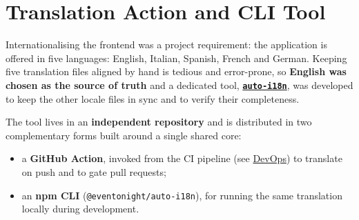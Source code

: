 \section{Translation Action and CLI Tool}

Internationalising the frontend was a project requirement: the application is offered in five languages: English, Italian, Spanish, French and German. Keeping five translation files aligned by hand is tedious and error-prone, so \textbf{English was chosen as the source of truth} and a dedicated tool, \href{https://github.com/EvenToNight/auto-i18n}{\textbf{\texttt{auto-i18n}}}, was developed to keep the other locale files in sync and to verify their completeness.

The tool lives in an \textbf{independent repository} and is distributed in two complementary forms built around a single shared core:

\begin{itemize}
  \item a \textbf{GitHub Action}, invoked from the CI pipeline (see \hyperref[sec:devops]{DevOps}) to translate on push and to gate pull requests;
  \item an \textbf{npm CLI} (\texttt{@eventonight/auto-i18n}), for running the same translation locally during development.
\end{itemize}
